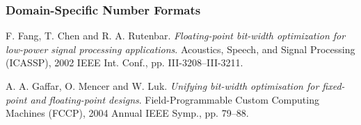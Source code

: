 \begin{frame}

\frametitle{Domain-Specific Number Formats}

\footnotesize

\begin{thebibliography}{9}

 F. Fang, T. Chen and R. A.  Rutenbar.
\emph{Floating-point bit-width optimization for low-power signal processing
applications}. Acoustics, Speech, and Signal Processing (ICASSP), 2002 IEEE
Int. Conf., pp. III-3208--III-3211.

 A. A. Gaffar, O. Mencer and W. Luk. \emph{Unifying
bit-width optimisation for fixed-point and floating-point designs}.
Field-Programmable Custom Computing Machines (FCCP), 2004 Annual IEEE Symp.,
pp.  79--88.

\end{thebibliography}

\end{frame}
